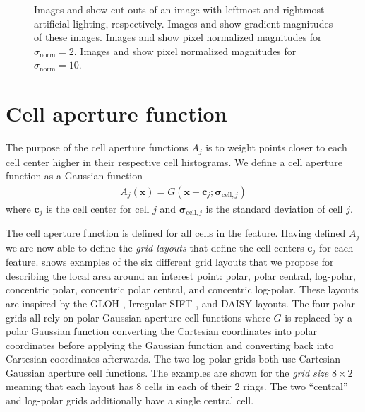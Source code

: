 \documentclass[thesis.tex]{subfiles}
\def\x{\mathbf{x}}
\def\c{\mathbf{c}}
\def\sigmacellj{\boldsymbol{\sigma}_{\text{cell},j}}
\begin{document}
\begin{figure}[p]
\begin{subfigure}[t]{0.48\textwidth}
        \caption{}
        \label{fig:pixelNormalizationExample8}
    \end{subfigure}
    \caption{Images  and  show cut-outs of an image with leftmost and rightmost artificial lighting, respectively. Images  and  show gradient magnitudes of these images. Images  and  show pixel normalized magnitudes for $\sigma_\text{norm} = 2$. Images  and  show pixel normalized magnitudes for $\sigma_\text{norm} = 10$.}
    \label{fig:pixelNormalizationExample}
\end{figure}
%
\section{Cell aperture function}
\label{sec:cellApertureFunction}
%
The purpose of the cell aperture functions $A_j$ is to weight points closer to each cell center higher in their respective cell histograms. We define a cell aperture function as a Gaussian function
%
\begin{align}
A_j(\x) = G(\x - \c_j; \sigmacellj)
\end{align}
%
where $\c_j$ is the cell center for cell $j$ and $\sigmacellj$ is the standard deviation of cell $j$.

The cell aperture function is defined for all cells in the feature. Having defined $A_j$ we are now able to define the \emph{grid layouts} that define the cell centers $\boldsymbol{c}_j$ for each feature.  shows examples of the six different grid layouts that we propose for describing the local area around an interest point: polar, polar central, log-polar, concentric polar, concentric polar central, and concentric log-polar. These layouts are inspired by the GLOH \cite{mikolajczyk2005performance}, Irregular SIFT \cite{cui2009scale}, and DAISY \cite{tola2008fast} layouts. The four polar grids all rely on polar Gaussian aperture cell functions where $G$ is replaced by a polar Gaussian function converting the Cartesian coordinates into polar coordinates before applying the Gaussian function and converting back into Cartesian coordinates afterwards. The two log-polar grids both use Cartesian Gaussian aperture cell functions. The examples are shown for the \emph{grid size} $8\times 2$ meaning that each layout has 8 cells in each of their 2 rings. The two ``central'' and log-polar grids additionally have a single central cell.
\end{document}
